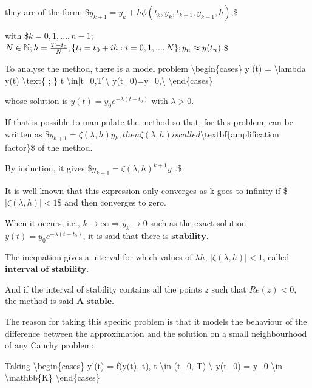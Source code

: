 \documentclass[letterpaper,10pt,english]{jupyterBook}
\begin{document}
\sphinxAtStartPar
they are of the form:
\$\(
y_{k+1} = y_{k} + h \phi (t_{k},y_{k},t_{k+1},y_{k+1},h) \text{,}
\)\$

\sphinxAtStartPar
with \$\(k = 0, 1, ..., n-1;\)\(
\)\(
N \in \mathbb{N}; h = \frac{T-t_0}{N}; \\
\{t_i = t_0 + ih : i = 0, 1, ..., N\}; \\ 
y_n \thickapprox y(t_n) .
\)\$

\sphinxAtStartPar
To analyse the method, there is a model problem
\textbackslash{}begin\{cases\}
y’(t) = \sphinxhyphen{} \textbackslash{}lambda y(t) \textbackslash{}text\{ ; \} t \textbackslash{}in{[}t\_0,T{]}\textbackslash{}
y(t\_0)=y\_0,\textbackslash{}
\textbackslash{}end\{cases\}

\sphinxAtStartPar
whose solution is \(y(t) = y_0 e^{-\lambda (t-t_0)}\)
with \(\lambda > 0.\)

\sphinxAtStartPar
If that is possible to manipulate the method so that, for this problem, can be written as
\$\(
y_{k+1} = \zeta(\lambda,h) y_k,
\)\(
then \)\(\zeta(\lambda,h)\)\( is called \)\textbackslash{}textbf\{amplification factor\}\$ of the method.

\sphinxAtStartPar
By induction, it gives
\$\(
y_{k+1} = \zeta(\lambda, h)^{k+1} y_0.
\)\$

\sphinxAtStartPar
It is well known that this expression only converges as k goes to infinity if
\$\(
|\zeta(\lambda, h)| < 1
\)\$
and then converges to zero.

\sphinxAtStartPar
When it occurs, i.e., \(k \rightarrow \infty \Rightarrow y_k \rightarrow 0\) such as the exact solution \(y(t) = y_0 e^{-\lambda (t-t_0)}\), it is said that there is \(\textbf{stability}\).

\sphinxAtStartPar
The inequation gives a interval for which values of \(\lambda h\), \(|\zeta(\lambda, h)|<1\), called \(\textbf{interval of stability}\).

\sphinxAtStartPar
And if the interval of stability contains all the points \(z\) such that \(Re(z) < 0\), the method is said \(\textbf{A-stable}\).

\sphinxAtStartPar
The reason for taking this specific problem is that it models the behaviour of the difference between the approximation and the solution on a small neighbourhood of any Cauchy problem:

\sphinxAtStartPar
Taking
\textbackslash{}begin\{cases\}
y’(t) = f(y(t), t), t \textbackslash{}in (t\_0, T) \textbackslash{}
y(t\_0) = y\_0 \textbackslash{}in \textbackslash{}mathbb\{K\}
\textbackslash{}end\{cases\}
\end{document}
